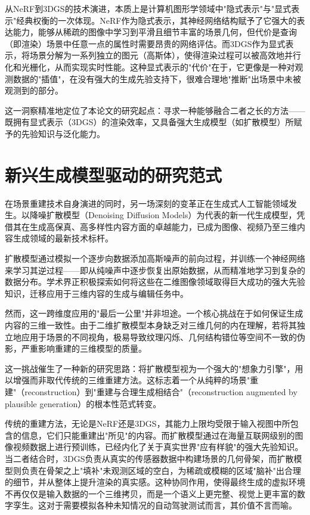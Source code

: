 从NeRF到3DGS的技术演进，本质上是计算机图形学领域中"隐式表示"与"显式表示"经典权衡的一次体现。NeRF作为隐式表示，其神经网络结构赋予了它强大的表达能力，能够从稀疏的图像中学习到平滑且细节丰富的场景几何，但代价是查询（即渲染）场景中任意一点的属性时需要昂贵的网络评估\cite{mildenhall2021nerf}。而3DGS作为显式表示，将场景分解为一系列独立的图元（高斯体），使得渲染过程可以被高效地并行化和光栅化，从而实现实时性能\cite{kerbl2023gaussian}。这种显式表示的"代价"在于，它更像是一种对观测数据的"插值"，在没有强大的生成先验支持下，很难合理地"推断"出场景中未被观测到的部分。

这一洞察精准地定位了本论文的研究起点：寻求一种能够融合二者之长的方法——既拥有显式表示（3DGS）的渲染效率，又具备强大生成模型（如扩散模型）所赋予的先验知识与泛化能力。

\section{新兴生成模型驱动的研究范式}

在场景重建技术自身演进的同时，另一场深刻的变革正在生成式人工智能领域发生。以降噪扩散模型（Denoising Diffusion Models）为代表的新一代生成模型，凭借其在生成高保真、高多样性内容方面的卓越能力，已成为图像、视频乃至三维内容生成领域的最新技术标杆\cite{ho2020denoising}。

扩散模型通过模拟一个逐步向数据添加高斯噪声的前向过程，并训练一个神经网络来学习其逆过程——即从纯噪声中逐步恢复出原始数据，从而精准地学习到复杂的数据分布\cite{ho2020denoising}。学术界正积极探索如何将这些在二维图像领域取得巨大成功的强大先验知识，迁移应用于三维内容的生成与编辑任务中\cite{ho2020denoising}。

然而，这一跨维度应用的"最后一公里"并非坦途。一个核心挑战在于如何保证生成内容的三维一致性。由于二维扩散模型本身缺乏对三维几何的内在理解，若将其独立地应用于场景的不同视角，极易导致纹理闪烁、几何结构错位等空间不一致的伪影，严重影响重建的三维模型的质量\cite{rossle2024l3dg}。

这一挑战催生了一种新的研究思路：将扩散模型视为一个强大的"想象力引擎"，用以增强而非取代传统的三维重建方法。这标志着一个从纯粹的场景"重建"（reconstruction）到"重建与合理生成相结合"（reconstruction augmented by plausible generation）的根本性范式转变。

传统的重建方法，无论是NeRF还是3DGS，其能力上限均受限于输入视图中所包含的信息，它们只能重建出"所见"的内容。而扩散模型通过在海量互联网级别的图像视频数据上进行预训练，已经内化了关于真实世界"应有样貌"的强大先验知识\cite{yan2024street}。当二者结合时，3DGS负责从真实的传感器数据中构建场景的几何骨架，而扩散模型则负责在骨架之上"填补"未观测区域的空白，为稀疏或模糊的区域"脑补"出合理的细节，并从整体上提升渲染的真实感。这种协同作用，使得最终生成的虚拟环境不再仅仅是输入数据的一个三维拷贝，而是一个语义上更完整、视觉上更丰富的数字孪生。这对于需要模拟各种未知情况的自动驾驶测试而言，其价值不言而喻。

